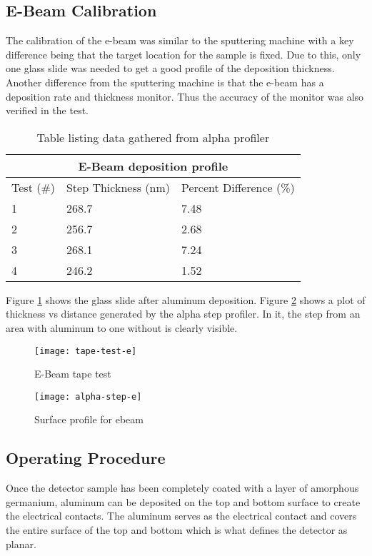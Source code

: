 \subsection{E-Beam Calibration}
The calibration of the e-beam was similar to the sputtering machine with a key difference being that the target location for the sample is fixed.
Due to this, only one glass slide was needed to get a good profile of the deposition thickness.
Another difference from the sputtering machine is that the e-beam has a deposition rate and thickness monitor.
Thus the accuracy of the monitor was also verified in the test.
\begin{table}[htpb]
\centering
\begin{tabular}{ |p{4cm}|p{4cm}|p{4cm}|  }
 \hline
 \multicolumn{3}{|c|}{E-Beam deposition profile} \\
 \hline
 Test (\#)&Step Thickness (nm)&Percent Difference (\%)\\
 \hline
 1   & 268.7    &7.48\\
 2&   256.7  & 2.68\\
 3 &268.1 & 7.24\\
 4    &246.2 & 1.52\\
 \hline
\end{tabular}
\caption{Table listing data gathered from alpha profiler}
\label{table:test-e}
\end{table}

Figure \ref{fig:tape-test-e} shows the glass slide after aluminum deposition.
Figure \ref{fig:alpha-step-e} shows a plot of thickness vs distance generated by the alpha step profiler.
In it, the step from an area with aluminum to one without is clearly visible.

\begin{figure}[htpb]
\centering
\texttt{[image: tape-test-e]}
\caption{E-Beam tape test}
\label{fig:tape-test-e}
\end{figure}

\begin{figure}[htpb]
\centering
\texttt{[image: alpha-step-e]}
\caption{Surface profile for ebeam}
\label{fig:alpha-step-e}
\end{figure}

\subsection{Operating Procedure}
Once the detector sample has been completely coated with a layer of amorphous germanium, aluminum can be deposited on the top and bottom surface to create the electrical contacts.
The aluminum serves as the electrical contact and covers the entire surface of the top and bottom which is what defines the detector as planar.

